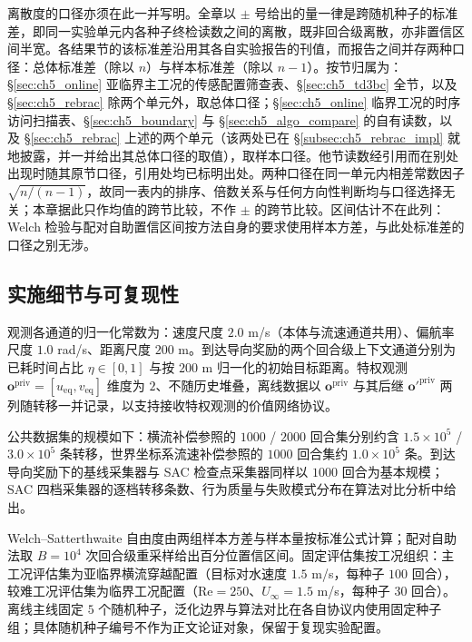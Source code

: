 离散度的口径亦须在此一并写明。全章以 $\pm$ 号给出的量一律是跨随机种子的标准差，即同一实验单元内各种子终检读数之间的离散，既非回合级离散，亦非置信区间半宽。各结果节的该标准差沿用其各自实验报告的刊值，而报告之间并存两种口径：总体标准差（除以 $n$）与样本标准差（除以 $n-1$）。按节归属为：\S\ref{sec:ch5_online} 亚临界主工况的传感配置筛查表、\S\ref{sec:ch5_td3bc} 全节，以及 \S\ref{sec:ch5_rebrac} 除两个单元外，取总体口径；\S\ref{sec:ch5_online} 临界工况的时序访问扫描表、\S\ref{sec:ch5_boundary} 与 \S\ref{sec:ch5_algo_compare} 的自有读数，以及 \S\ref{sec:ch5_rebrac} 上述的两个单元（该两处已在 \S\ref{subsec:ch5_rebrac_impl} 就地披露，并一并给出其总体口径的取值），取样本口径。他节读数经引用而在别处出现时随其原节口径，引用处均已标明出处。两种口径在同一单元内相差常数因子 $\sqrt{n/(n-1)}$，故同一表内的排序、倍数关系与任何方向性判断均与口径选择无关；本章据此只作均值的跨节比较，不作 $\pm$ 的跨节比较。区间估计不在此列：Welch 检验与配对自助置信区间按方法自身的要求使用样本方差，与此处标准差的口径之别无涉。

\subsection{实施细节与可复现性}\label{subsec:ch5_impl}

观测各通道的归一化常数为：速度尺度 $2.0$ m/s（本体与流速通道共用）、偏航率尺度 $1.0$ rad/s、距离尺度 $200$ m。到达导向奖励的两个回合级上下文通道分别为已耗时间占比 $\eta\in[0,1]$ 与按 $200$ m 归一化的初始目标距离。特权观测 $\mathbf{o}^{\mathrm{priv}}=[u_{\mathrm{eq}},v_{\mathrm{eq}}]$ 维度为 $2$、不随历史堆叠，离线数据以 $\mathbf{o}^{\mathrm{priv}}$ 与其后继 $\mathbf{o}'^{\mathrm{priv}}$ 两列随转移一并记录，以支持接收特权观测的价值网络协议。

公共数据集的规模如下：横流补偿参照的 $1000$ / $2000$ 回合集分别约含 $1.5\times10^5$ / $3.0\times10^5$ 条转移，世界坐标系流速补偿参照的 $1000$ 回合集约 $1.0\times10^5$ 条。到达导向奖励下的基线采集器与 SAC 检查点采集器同样以 $1000$ 回合为基本规模；SAC 四档采集器的逐档转移条数、行为质量与失败模式分布在算法对比分析中给出。

Welch--Satterthwaite 自由度由两组样本方差与样本量按标准公式计算；配对自助法取 $B=10^4$ 次回合级重采样给出百分位置信区间。固定评估集按工况组织：主工况评估集为亚临界横流穿越配置（目标对水速度 $1.5$ m/s，每种子 $100$ 回合），较难工况评估集为临界工况配置（$\mathrm{Re}=250$、$U_\infty=1.5$ m/s，每种子 $30$ 回合）。离线主线固定 $5$ 个随机种子，泛化边界与算法对比在各自协议内使用固定种子组；具体随机种子编号不作为正文论证对象，保留于复现实验配置。

